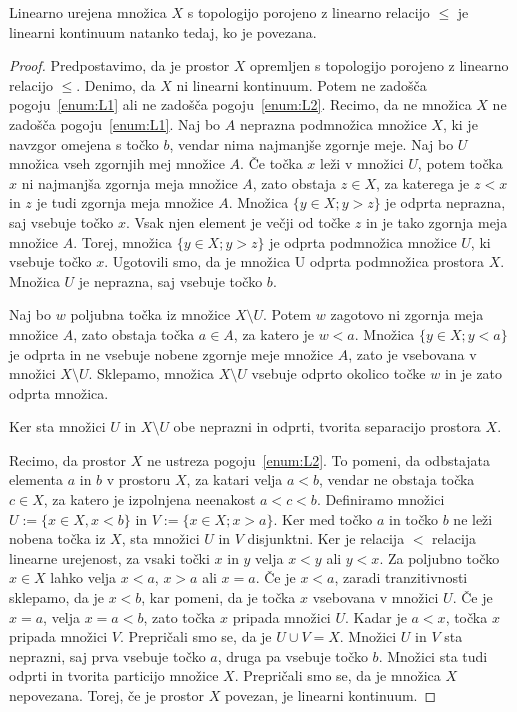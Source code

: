 \documentclass[../TG_magistrsko_delo_sections.tex]{subfiles}
\begin{document}
\begin{trditev}
Linearno urejena množica $X$ s topologijo porojeno z linearno relacijo $\leq$ je linearni kontinuum natanko tedaj, ko je povezana.
\end{trditev}
\begin{proof}
Predpostavimo, da je prostor $X$ opremljen s topologijo porojeno z linearno relacijo $\leq$. Denimo, da $X$ ni linearni kontinuum. Potem ne zadošča pogoju~\ref{enum:L1} ali ne zadošča pogoju~\ref{enum:L2}. Recimo, da ne množica $X$ ne zadošča pogoju~\ref{enum:L1}. Naj bo $A$ neprazna podmnožica množice $X$, ki je navzgor omejena s točko $b$, vendar nima najmanjše zgornje meje. Naj bo $U$ množica vseh zgornjih mej množice $A$. Če točka $x$ leži v množici $U$, potem točka $x$ ni najmanjša zgornja meja množice $A$, zato obstaja $z \in X$, za katerega je $z < x$ in $z$ je tudi zgornja meja množice $A$. Množica $\{y \in X; y > z\}$ je odprta neprazna, saj vsebuje točko $x$. Vsak njen element je večji od točke $z$ in je tako zgornja meja množice $A$. Torej, množica $\{y \in X; y > z\}$ je odprta podmnožica množice $U$, ki vsebuje točko $x$. Ugotovili smo, da je množica U odprta podmnožica prostora $X$. Množica $U$ je neprazna, saj vsebuje točko $b$. 

Naj bo $w$ poljubna točka iz množice $X \setminus U$. Potem $w$ zagotovo ni zgornja meja množice $A$, zato obstaja točka $a \in A$, za katero je $w < a$. Množica $\{y \in X; y< a\}$ je odprta in ne vsebuje nobene zgornje meje množice $A$, zato je vsebovana v množici $X \setminus U$. Sklepamo, množica $X \setminus U$ vsebuje odprto okolico točke $w$ in je zato odprta množica. 

Ker sta množici $U$ in $X \setminus U$ obe neprazni in odprti, tvorita separacijo prostora $X$. 

Recimo, da prostor $X$ ne ustreza pogoju~\ref{enum:L2}. To pomeni, da odbstajata elementa $a$ in $b$ v prostoru $X$, za katari velja $a < b$, vendar ne obstaja točka $c \in X$, za katero je izpolnjena neenakost $a < c < b$. Definiramo množici $U := \{x \in X, x <b\}$ in $V:= \{x\in X;x>a\}$. Ker med točko $a$ in točko $b$ ne leži nobena točka iz $X$, sta množici $U$ in $V$ disjunktni. Ker je relacija $<$ relacija linearne urejenost, za vsaki točki $x$ in $y$ velja $x < y$ ali $y < x$. Za poljubno točko $x \in X$ lahko velja $x<a$, $x>a$ ali $x=a$.
Če je $x<a$, zaradi tranzitivnosti sklepamo, da je $x<b$, kar pomeni, da je točka $x$ vsebovana v množici $U$. Če je $x=a$, velja $x=a<b$, zato točka $x$ pripada množici $U$. Kadar je $a<x$, točka $x$ pripada množici $V$. Prepričali smo se, da je $U \cup V = X$. Množici $U$ in $V$ sta neprazni, saj prva vsebuje točko $a$, druga pa vsebuje točko $b$. Množici sta tudi odprti in tvorita particijo množice $X$. Prepričali smo se, da je množica $X$ nepovezana.
Torej, če je prostor $X$ povezan, je linearni kontinuum.


\end{proof}
\end{document}
